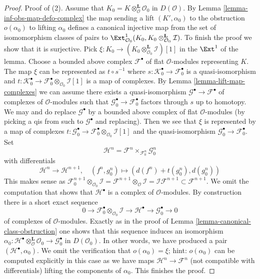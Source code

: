 \begin{proof}
\medskip\noindent
Proof of (2).
Assume that $K_0 = K \otimes_\mathcal{O}^\mathbf{L} \mathcal{O}_0$
in $D(\mathcal{O})$. By Lemma \ref{lemma-inf-obs-map-defo-complex}
the map sending a lift $(K', \alpha_0)$ to the obstruction $o(\alpha_0)$
to lifting $\alpha_0$ defines a canonical injective map
from the set of isomomorphism classes of pairs
to $\Ext^1_{\mathcal{O}_0}(K_0,
K_0 \otimes_{\mathcal{O}_0}^\mathbf{L} \mathcal{I})$.
To finish the proof we show that it is surjective.
Pick $\xi : K_0 \to (K_0 \otimes_{\mathcal{O}_0}^\mathbf{L} \mathcal{I})[1]$
in the $\Ext^1$ of the lemma.
Choose a bounded above complex $\mathcal{F}^\bullet$
of flat $\mathcal{O}$-modules representing $K$.
The map $\xi$ can be represented as $t \circ s^{-1}$
where $s : \mathcal{K}_0^\bullet \to \mathcal{F}_0^\bullet$
is a quasi-isomorphism and
$t : \mathcal{K}_0^\bullet \to
\mathcal{F}_0^\bullet \otimes_{\mathcal{O}_0} \mathcal{I}[1]$
is a map of complexes.
By Lemma \ref{lemma-lift-map-complexes}
we can assume there exists a quasi-isomorphism
$\mathcal{G}^\bullet \to \mathcal{F}^\bullet$
of complexes of $\mathcal{O}$-modules
such that $\mathcal{G}_0^\bullet \to \mathcal{F}_0^\bullet$
factors through $s$ up to homotopy.
We may and do replace $\mathcal{G}^\bullet$ by a bounded
above complex of flat $\mathcal{O}$-modules (by picking a qis
from such to $\mathcal{G}^\bullet$ and replacing).
Then we see that $\xi$ is represented by
a map of complexes
$t : \mathcal{G}_0^\bullet \to
\mathcal{F}_0^\bullet \otimes_{\mathcal{O}_0} \mathcal{I}[1]$
and the quasi-isomorphism $\mathcal{G}_0^\bullet \to \mathcal{F}_0^\bullet$.
Set
$$
\mathcal{H}^n = \mathcal{F}^n \times_{\mathcal{F}_0^n} \mathcal{G}_0^n
$$
with differentials
$$
\mathcal{H}^n \to \mathcal{H}^{n + 1},\quad
(f^n, g_0^n) \mapsto (d(f^n) + t(g_0^n), d(g_0^n))
$$
This makes sense as
$\mathcal{F}_0^{n + 1} \otimes_{\mathcal{O}_0} \mathcal{I} =
\mathcal{F}^{n + 1} \otimes_\mathcal{O} \mathcal{I} =
\mathcal{I}\mathcal{F}^{n + 1} \subset \mathcal{F}^{n + 1}$.
We omit the computation that shows that $\mathcal{H}^\bullet$
is a complex of $\mathcal{O}$-modules. By construction there is
a short exact sequence
$$
0 \to \mathcal{F}_0^\bullet \otimes_{\mathcal{O}_0} \mathcal{I} \to
\mathcal{H}^\bullet \to \mathcal{G}_0^\bullet \to 0
$$
of complexes of $\mathcal{O}$-modules.
Exactly as in the proof of Lemma \ref{lemma-canonical-class-obstruction}
one shows that this sequence induces an isomorphism
$\alpha_0 :
\mathcal{H}^\bullet \otimes_\mathcal{O}^\mathbf{L} \mathcal{O}_0 \to
\mathcal{G}_0^\bullet$ in $D(\mathcal{O}_0)$.
In other words, we have produced a pair $(\mathcal{H}^\bullet, \alpha_0)$.
We omit the verification that $o(\alpha_0) = \xi$; hint: $o(\alpha_0)$
can be computed explicitly in this case as we have maps
$\mathcal{H}^n \to \mathcal{F}^n$ (not compatible with differentials)
lifting the components of $\alpha_0$. This finishes the proof.
\end{proof}


















